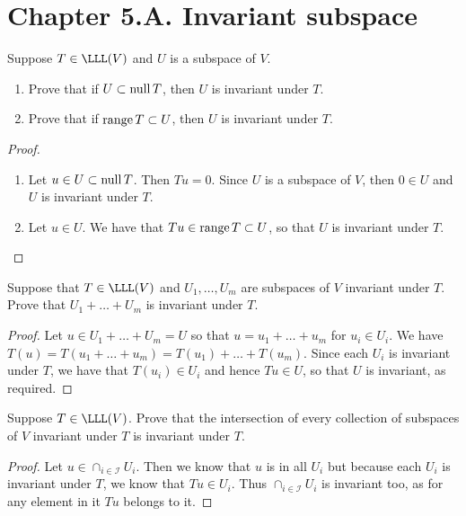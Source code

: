 \section*{Chapter 5.A. Invariant subspace}


\begin{exercise}{1}
  Suppose $T\in\LLL(V)$ and $U$ is a subspace of $V$.
  \begin{enumerate}
      \item Prove that if $U\subset\operatorname*{null} T$, then $U$ is invariant under $T$.
      \item Prove that if $\operatorname*{range} T\subset U$, then $U$ is invariant under $T$.
  \end{enumerate}
\end{exercise}
\begin{proof}
 \begin{enumerate}
     \item Let $u\in U\subset\operatorname*{null} T$. Then $Tu=0$. Since $U$ is a subspace of $V$, then $0\in U$ and $U$ is invariant under $T$.
     \item Let $u\in U$. We have that $Tu\in\operatorname*{range} T\subset U$, so that $U$ is invariant under $T$.
 \end{enumerate}
\end{proof}

\begin{exercise}{4}
  Suppose that $T\in\LLL(V)$ and $U_1,\dots,U_m$ are subspaces of $V$ invariant under $T$. Prove that $U_1+\dots+U_m$ is invariant under $T$.
\end{exercise}
\begin{proof}
 Let $u\in U_1+\dots+U_m=U$ so that $u=u_1+\dots+u_m$ for $u_i\in U_i$. We have $T(u)=T(u_1+\dots+u_m)=T(u_1)+\dots+T(u_m)$. Since each $U_i$ is invariant under $T$, we have that $T(u_i)\in U_i$ and hence $Tu\in U$, so that $U$ is invariant, as required.
\end{proof}

\begin{exercise}{5}
  Suppose $T\in\LLL(V)$. Prove that the intersection of every collection of subspaces of $V$ invariant under $T$ is invariant under $T$.
\end{exercise}
\begin{proof}
 Let $u\in\cap_{i\in\mathcal{I}}U_i$. Then we know that $u$ is in all $U_i$ but because each $U_i$ is invariant under $T$, we know that $Tu\in U_i$. Thus $\cap_{i\in\mathcal{I}}U_i$ is invariant too, as for any element in it $Tu$ belongs to it.
\end{proof}

